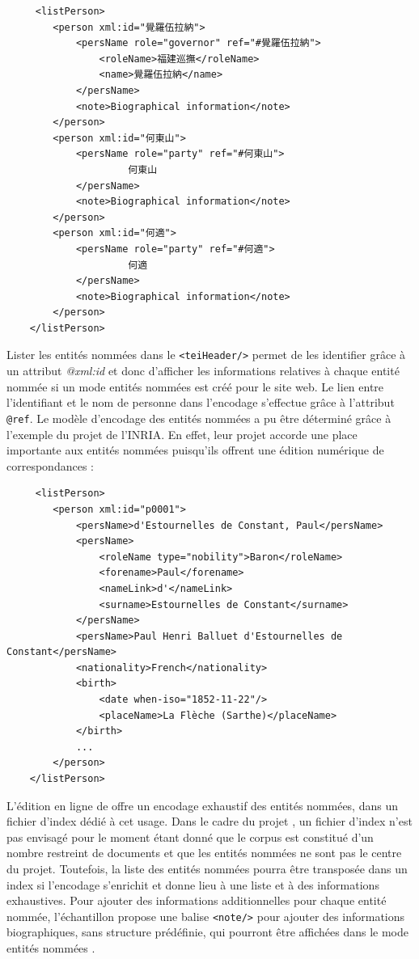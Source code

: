 \begin{verbatim}
     <listPerson>
        <person xml:id="覺羅伍拉納">
            <persName role="governor" ref="#覺羅伍拉納">
                <roleName>福建巡撫</roleName>
                <name>覺羅伍拉納</name>
            </persName>
            <note>Biographical information</note>
        </person>
        <person xml:id="何東山">
            <persName role="party" ref="#何東山">
                     何東山
            </persName>
            <note>Biographical information</note>
        </person>
        <person xml:id="何適">
            <persName role="party" ref="#何適">
                     何適
            </persName>
            <note>Biographical information</note>
        </person>
    </listPerson>
\end{verbatim}
Lister les entités nommées dans le \texttt{<teiHeader/>} permet de les identifier grâce à un attribut \textit{@xml:id} et donc d'afficher les informations relatives à chaque entité nommée si un mode \og entités nommées \fg est créé pour le site web. Le lien entre l'identifiant \XML et le nom de personne dans l'encodage s'effectue grâce à l'attribut \texttt{@ref}. Le modèle d'encodage des entités nommées a pu être déterminé grâce à l'exemple du projet \disco de l'INRIA. En effet, leur projet accorde une place importante aux entités nommées puisqu'ils offrent une édition numérique de correspondances : 
\begin{verbatim}
     <listPerson>
        <person xml:id="p0001">
            <persName>d'Estournelles de Constant, Paul</persName>
            <persName>
                <roleName type="nobility">Baron</roleName>
                <forename>Paul</forename>
                <nameLink>d'</nameLink>
                <surname>Estournelles de Constant</surname>
            </persName>
            <persName>Paul Henri Balluet d'Estournelles de Constant</persName>
            <nationality>French</nationality>
            <birth>
                <date when-iso="1852-11-22"/>
                <placeName>La Flèche (Sarthe)</placeName>
            </birth>
            ...
        </person>
    </listPerson>
\end{verbatim}
L'édition en ligne de \disco offre un encodage exhaustif des entités nommées, dans un fichier d'index \TEI dédié à cet usage. Dans le cadre du projet \COREL, un fichier d'index n'est pas envisagé pour le moment étant donné que le corpus est constitué d'un nombre restreint de documents et que les entités nommées ne sont pas le centre du projet. Toutefois, la liste des entités nommées pourra être transposée dans un index si l'encodage s'enrichit et donne lieu à une liste et à des informations exhaustives. Pour ajouter des informations additionnelles pour chaque entité nommée, l'échantillon propose une balise \texttt{<note/>} pour ajouter des informations biographiques, sans structure prédéfinie, qui pourront être affichées dans le mode \og entités nommées \fg. 

